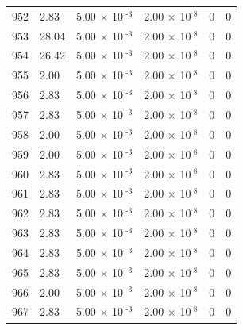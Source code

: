 \documentclass[a4paper,11pt]{article}
\begin{document}
\begin{center}
\begin{longtable}{|R{1.5cm}|R{2.4cm}|R{2.4cm}|R{2.4cm}|R{2.4cm}|R{2.4cm}|}
  952 &   2.83  &         5.00 $\times$ 10$^{\text{          -3}}$  &         2.00 $\times$ 10$^{\text{           8}}$  & 0  & 0 \\
  953 &  28.04  &         5.00 $\times$ 10$^{\text{          -3}}$  &         2.00 $\times$ 10$^{\text{           8}}$  & 0  & 0 \\
  954 &  26.42  &         5.00 $\times$ 10$^{\text{          -3}}$  &         2.00 $\times$ 10$^{\text{           8}}$  & 0  & 0 \\
  955 &   2.00  &         5.00 $\times$ 10$^{\text{          -3}}$  &         2.00 $\times$ 10$^{\text{           8}}$  & 0  & 0 \\
  956 &   2.83  &         5.00 $\times$ 10$^{\text{          -3}}$  &         2.00 $\times$ 10$^{\text{           8}}$  & 0  & 0 \\
  957 &   2.83  &         5.00 $\times$ 10$^{\text{          -3}}$  &         2.00 $\times$ 10$^{\text{           8}}$  & 0  & 0 \\
  958 &   2.00  &         5.00 $\times$ 10$^{\text{          -3}}$  &         2.00 $\times$ 10$^{\text{           8}}$  & 0  & 0 \\
  959 &   2.00  &         5.00 $\times$ 10$^{\text{          -3}}$  &         2.00 $\times$ 10$^{\text{           8}}$  & 0  & 0 \\
  960 &   2.83  &         5.00 $\times$ 10$^{\text{          -3}}$  &         2.00 $\times$ 10$^{\text{           8}}$  & 0  & 0 \\
  961 &   2.83  &         5.00 $\times$ 10$^{\text{          -3}}$  &         2.00 $\times$ 10$^{\text{           8}}$  & 0  & 0 \\
  962 &   2.83  &         5.00 $\times$ 10$^{\text{          -3}}$  &         2.00 $\times$ 10$^{\text{           8}}$  & 0  & 0 \\
  963 &   2.83  &         5.00 $\times$ 10$^{\text{          -3}}$  &         2.00 $\times$ 10$^{\text{           8}}$  & 0  & 0 \\
  964 &   2.83  &         5.00 $\times$ 10$^{\text{          -3}}$  &         2.00 $\times$ 10$^{\text{           8}}$  & 0  & 0 \\
  965 &   2.83  &         5.00 $\times$ 10$^{\text{          -3}}$  &         2.00 $\times$ 10$^{\text{           8}}$  & 0  & 0 \\
  966 &   2.00  &         5.00 $\times$ 10$^{\text{          -3}}$  &         2.00 $\times$ 10$^{\text{           8}}$  & 0  & 0 \\
  967 &   2.83  &         5.00 $\times$ 10$^{\text{          -3}}$  &         2.00 $\times$ 10$^{\text{           8}}$  & 0  & 0 \\

\end{longtable}
\end{center}
\end{document}
